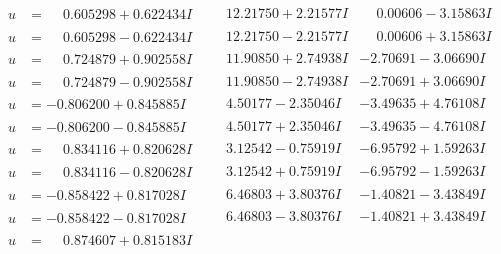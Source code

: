 \documentclass[1p]{elsarticle_modified}
\theoremstyle{definition}
\begin{document}
$$\begin{array}{c|c|c}
\begin{aligned}
u &= \phantom{-}0.605298 + 0.622434 I\end{aligned}
 & \phantom{-}12.21750 + 2.21577 I & \phantom{-}0.00606 - 3.15863 I \\ \hline\begin{aligned}
u &= \phantom{-}0.605298 - 0.622434 I\end{aligned}
 & \phantom{-}12.21750 - 2.21577 I & \phantom{-}0.00606 + 3.15863 I \\ \hline\begin{aligned}
u &= \phantom{-}0.724879 + 0.902558 I\end{aligned}
 & \phantom{-}11.90850 + 2.74938 I & -2.70691 - 3.06690 I \\ \hline\begin{aligned}
u &= \phantom{-}0.724879 - 0.902558 I\end{aligned}
 & \phantom{-}11.90850 - 2.74938 I & -2.70691 + 3.06690 I \\ \hline\begin{aligned}
u &= -0.806200 + 0.845885 I\end{aligned}
 & \phantom{-}4.50177 - 2.35046 I & -3.49635 + 4.76108 I \\ \hline\begin{aligned}
u &= -0.806200 - 0.845885 I\end{aligned}
 & \phantom{-}4.50177 + 2.35046 I & -3.49635 - 4.76108 I \\ \hline\begin{aligned}
u &= \phantom{-}0.834116 + 0.820628 I\end{aligned}
 & \phantom{-}3.12542 - 0.75919 I & -6.95792 + 1.59263 I \\ \hline\begin{aligned}
u &= \phantom{-}0.834116 - 0.820628 I\end{aligned}
 & \phantom{-}3.12542 + 0.75919 I & -6.95792 - 1.59263 I \\ \hline\begin{aligned}
u &= -0.858422 + 0.817028 I\end{aligned}
 & \phantom{-}6.46803 + 3.80376 I & -1.40821 - 3.43849 I \\ \hline\begin{aligned}
u &= -0.858422 - 0.817028 I\end{aligned}
 & \phantom{-}6.46803 - 3.80376 I & -1.40821 + 3.43849 I \\ \hline\begin{aligned}
u &= \phantom{-}0.874607 + 0.815183 I\end{aligned}

\end{array}$$
\end{document}

